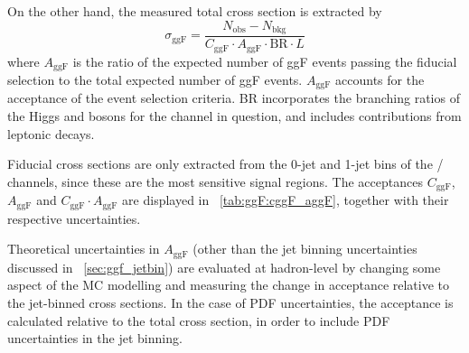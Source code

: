 On the other hand, the measured total cross section is extracted by
\begin{equation}
	\sigma_{\text{ggF}} = \frac{N_{\text{obs}} - N_{\text{bkg}}}{C_{\text{ggF}} \cdot A_{\text{ggF}} \cdot \text{BR} \cdot L}
	\label{eq:ggF:total_xs}
\end{equation}
where $A_{\text{ggF}}$ is the ratio of the expected number of ggF events passing the 
fiducial selection to the total expected number of ggF events. $A_{\text{ggF}}$ accounts 
for the acceptance of the event selection criteria. BR incorporates the branching 
ratios of the Higgs and \PW bosons for the channel in question, and includes contributions 
from leptonic \Ptau decays.

Fiducial cross sections are only extracted from the 0-jet and 1-jet bins of the \emch/\mech 
channels, since these are the most sensitive signal regions. The acceptances 
$C_{\text{ggF}}$, $A_{\text{ggF}}$ and $C_{\text{ggF}} \cdot A_{\text{ggF}}$ are displayed 
in \Table~\ref{tab:ggF:cggF_aggF}, together with their respective uncertainties.

Theoretical uncertainties in $A_{\text{ggF}}$ (other than the jet binning uncertainties 
discussed in \Section~\ref{sec:ggf_jetbin}) are evaluated at hadron-level by changing some 
aspect of the MC modelling and measuring the change in acceptance relative to the 
jet-binned cross sections. In the case of PDF uncertainties, the acceptance is calculated 
relative to the total cross section, in order to include PDF uncertainties in the jet 
binning.

